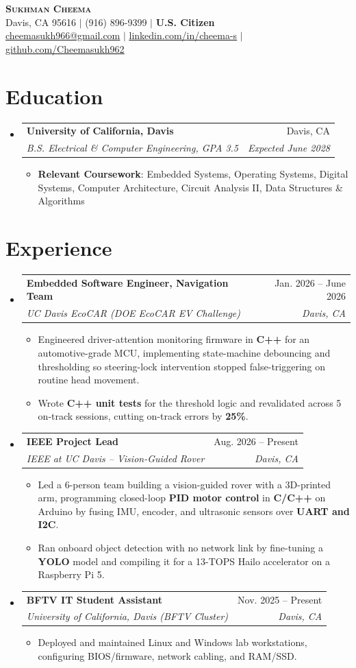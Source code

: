 \documentclass[letterpaper,10pt]{article}
\makeatletter
\newcommand{\resumeItem}[1]{\item\small #1}
\newcommand{\resumeSubheading}[4]{
  \vspace{3pt}\item
    \begin{tabular*}{0.97\textwidth}[t]{l@{\extracolsep{\fill}}r}
      \textbf{\normalsize #1} & \normalsize #2 \\
      \textit{\small #3} & \textit{\small #4} \\
    \end{tabular*}\vspace{-3pt}
}
\newcommand{\resumeSubHeadingListStart}{\begin{itemize}[leftmargin=0.15in, label={}, itemsep=0pt, topsep=0pt]}
\newcommand{\resumeSubHeadingListEnd}{\end{itemize}}
\newcommand{\resumeItemListStart}{\begin{itemize}[label=\textbullet, leftmargin=0.18in, itemsep=1pt, parsep=0pt, topsep=1.5pt]}
\newcommand{\resumeItemListEnd}{\end{itemize}}
\makeatother
\begin{document}
\begin{center}
  \textbf{\huge \scshape Sukhman Cheema} \\ \vspace{4pt}
  \small Davis, CA 95616 $|$ (916) 896-9399 $|$ \textbf{U.S. Citizen} \\ \vspace{1pt}
  \href{mailto:cheemasukh966@gmail.com}{\underline{cheemasukh966@gmail.com}} $|$
  \href{https://linkedin.com/in/cheema-s/}{\underline{linkedin.com/in/cheema-s}} $|$
  \href{https://github.com/Cheemasukh962}{\underline{github.com/Cheemasukh962}}
\end{center}
\section{Education}
  \resumeSubHeadingListStart
    \resumeSubheading
      {University of California, Davis}{Davis, CA}
      {B.S. Electrical \& Computer Engineering, GPA 3.5}{Expected June 2028}
      \resumeItemListStart
        \resumeItem{\textbf{Relevant Coursework}: Embedded Systems, Operating Systems, Digital Systems, Computer Architecture, Circuit Analysis II, Data Structures \& Algorithms}
      \resumeItemListEnd
  \resumeSubHeadingListEnd
\section{Experience}
  \resumeSubHeadingListStart
    \resumeSubheading
      {Embedded Software Engineer, Navigation Team}{Jan. 2026 -- June 2026}
      {UC Davis EcoCAR (DOE EcoCAR EV Challenge)}{Davis, CA}
      \resumeItemListStart
        \resumeItem{Engineered driver-attention monitoring firmware in \textbf{C++} for an automotive-grade MCU, implementing state-machine debouncing and thresholding so steering-lock intervention stopped false-triggering on routine head movement.}
        \resumeItem{Wrote \textbf{C++ unit tests} for the threshold logic and revalidated across 5 on-track sessions, cutting on-track errors by \textbf{25\%}.}
      \resumeItemListEnd
    \resumeSubheading
      {IEEE Project Lead}{Aug. 2026 -- Present}
      {IEEE at UC Davis -- Vision-Guided Rover}{Davis, CA}
      \resumeItemListStart
        \resumeItem{Led a 6-person team building a vision-guided rover with a 3D-printed arm, programming closed-loop \textbf{PID motor control} in \textbf{C/C++} on Arduino by fusing IMU, encoder, and ultrasonic sensors over \textbf{UART and I2C}.}
        \resumeItem{Ran onboard object detection with no network link by fine-tuning a \textbf{YOLO} model and compiling it for a 13-TOPS Hailo accelerator on a Raspberry Pi 5.}
      \resumeItemListEnd
    \resumeSubheading
      {BFTV IT Student Assistant}{Nov. 2025 -- Present}
      {University of California, Davis (BFTV Cluster)}{Davis, CA}
      \resumeItemListStart
        \resumeItem{Deployed and maintained Linux and Windows lab workstations, configuring BIOS/firmware, network cabling, and RAM/SSD.}
      \resumeItemListEnd
  \resumeSubHeadingListEnd
\end{document}

